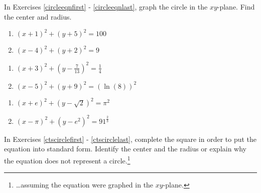 \documentclass{ximera}
\begin{document}
	\author{Stitz-Zeager}


\label{ExercisesforCircles}

In Exercises \ref{circleeqnfirst} - \ref{circleeqnlast}, graph the circle in the $xy$-plane.  Find the center and radius.

\begin{multicols}{2}
\begin{enumerate}

\item $(x + 1)^{2} + (y + 5)^{2} = 100$ \label{circleeqnfirst} \label{oddcircleone}
\item $(x-4)^2+(y+2)^2 = 9$

\setcounter{HW}{\value{enumi}}
\end{enumerate}
\end{multicols}

\begin{multicols}{2}
\begin{enumerate}
\setcounter{enumi}{\value{HW}}

\item $\left(x + 3\right)^{2} + \left(y - \frac{7}{13}\right)^{2} = \frac{1}{4}$ \label{oddcirclethree}

\item $(x - 5)^{2} + (y + 9)^{2} = (\ln(8))^{2}$


\setcounter{HW}{\value{enumi}}
\end{enumerate}
\end{multicols}

\begin{multicols}{2}
\begin{enumerate}
\setcounter{enumi}{\value{HW}}


\item $(x  + e)^{2} + \left(y - \sqrt{2} \right)^{2} = \pi^{2}$  \label{oddcirclefive}

\item $\left(x - \pi \right)^{2} + \left(y -  e^{2}\right)^{2} = 91^{\frac{2}{3}}$ \label{circleeqnlast}

\setcounter{HW}{\value{enumi}}
\end{enumerate}
\end{multicols}


In Exercises \ref{ctscirclefirst} - \ref{ctscirclelast}, complete the square in order to put the equation into standard form.  Identify the center and the radius or explain why the equation does not represent a circle.\footnote{\ldots assuming the equation were graphed in the $xy$-plane.}
\end{document}
